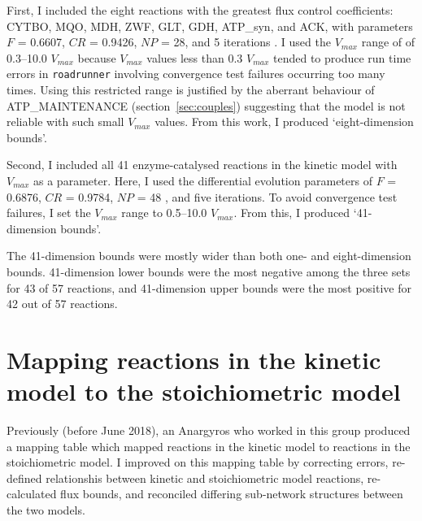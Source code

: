 \documentclass[parskip=full, numbers=noenddot]{scrreprt}
\begin{document}
First, I included the eight reactions with the greatest flux control coefficients: CYTBO, MQO, MDH, ZWF, GLT, GDH, ATP\_syn, and ACK, with parameters $F$ = 0.6607, $CR$ = 0.9426, $NP$ = 28, and 5 iterations \citep{pedersen_good_2010}. I used the $V_{max}$ range of of 0.3--10.0 $V_{max}$ because $V_{max}$ values less than 0.3 $V_{max}$ tended to produce run time errors in \texttt{roadrunner} involving convergence test failures occurring too many times. Using this restricted range is justified by the aberrant behaviour of ATP\_MAINTENANCE (section~\ref{sec:couples}) suggesting that the model is not reliable with such small $V_{max}$ values. From this work, I produced `eight-dimension bounds'.

Second, I included all 41 enzyme-catalysed reactions in the kinetic model with $V_{max}$ as a parameter. Here, I used the differential evolution parameters of $F$ = 0.6876, $CR$ = 0.9784, $NP$ = 48 \citep{pedersen_good_2010}, and five iterations. To avoid convergence test failures, I set the $V_{max}$ range to 0.5--10.0 $V_{max}$. From this, I produced `41-dimension bounds'.

The 41-dimension bounds were mostly wider than both one- and eight-dimension bounds. 41-dimension lower bounds were the most negative among the three sets for 43 of 57 reactions, and 41-dimension upper bounds were the most positive for 42 out of 57 reactions.

\section{Mapping reactions in the kinetic model to the stoichiometric model}
\label{sec:mapping}


Previously (before June 2018), an Anargyros who worked in this group produced a mapping table which mapped reactions in the kinetic model to reactions in the stoichiometric model. %
I improved on this mapping table by correcting errors, re-defined relationshis between kinetic and stoichiometric model reactions, re-calculated flux bounds, and reconciled differing sub-network structures between the two models.
\end{document}
